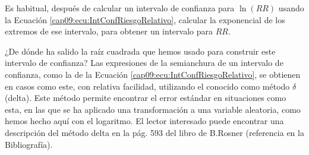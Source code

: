 \begin{center}
\end{center}

Es habitual, después de calcular un intervalo de confianza para $\ln(RR)$ usando la Ecuación \ref{cap09:ecu:IntConfRiesgoRelativo}, calcular la exponencial de los extremos de ese intervalo, para obtener un intervalo para $RR$.

¿De dónde ha salido la raíz cuadrada que hemos usado para construir este intervalo de confianza? Las expresiones de la semianchura de un intervalo de confianza, como la de la Ecuación \ref{cap09:ecu:IntConfRiesgoRelativo}, se obtienen en casos como este, con relativa facilidad, utilizando el conocido como {\sf método $\delta$ (delta)}. Este método permite encontrar el error estándar en situaciones como esta, en las que se ha aplicado una transformación a una variable aleatoria, como hemos hecho aquí con el logaritmo. El lector interesado puede encontrar una descripción del método delta en la pág. 593 del libro de B.Rosner (referencia \cite{rosner2011fundamentals} en la Bibliografía).

